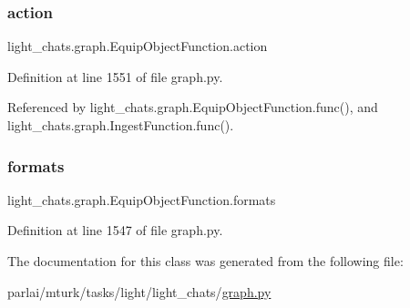 \subsubsection{\texorpdfstring{action}{action}}
{\footnotesize\ttfamily light\+\_\+chats.\+graph.\+Equip\+Object\+Function.\+action}



Definition at line 1551 of file graph.\+py.



Referenced by light\+\_\+chats.\+graph.\+Equip\+Object\+Function.\+func(), and light\+\_\+chats.\+graph.\+Ingest\+Function.\+func().

\mbox{\label{classlight__chats_1_1graph_1_1EquipObjectFunction_a798cbf33f30601ca3ac770b472ddbe6c}} 
\subsubsection{\texorpdfstring{formats}{formats}}
{\footnotesize\ttfamily light\+\_\+chats.\+graph.\+Equip\+Object\+Function.\+formats}



Definition at line 1547 of file graph.\+py.



The documentation for this class was generated from the following file\+:\begin{DoxyCompactItemize}
\item 
parlai/mturk/tasks/light/light\+\_\+chats/\hyperlink{parlai_2mturk_2tasks_2light_2light__chats_2graph_8py}{graph.\+py}\end{DoxyCompactItemize}
